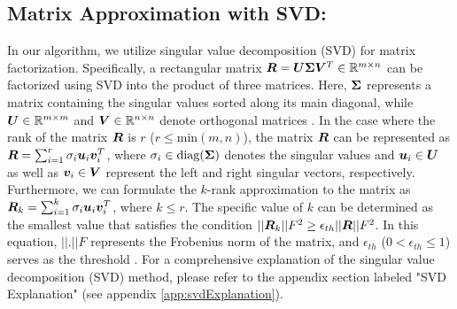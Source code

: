 \documentclass{article}
\begin{document}
\subsection{Matrix Approximation with SVD:}\vspace{-3mm} In our algorithm, we utilize singular value decomposition (SVD) for matrix factorization. Specifically, a rectangular matrix ${\bm{R}} = {\bm{U}}{\bm{\Sigma}}{\bm{V}}^T \in \mathbb{R}^{m\times n}$ can be factorized using SVD into the product of three matrices. Here, ${\bm{\Sigma}}$ represents a matrix containing the singular values sorted along its main diagonal, while ${\bm{U}} \in \mathbb{R}^{m\times m}$ and ${\bm{V}} \in \mathbb{R}^{n\times n}$ denote orthogonal matrices \cite{mml}. In the case where the rank of the matrix ${\bm{R}}$ is $r$ ($r\leq \text{min}(m,n)$), the matrix ${\bm{R}}$ can be represented as ${\bm{R}}=\sum_{i=1}^r \sigma_i{\bm{u}}_i {\bm{v}}_i^T$, where $\sigma_i \in \text{diag}({\bm{\Sigma}})$ denotes the singular values and ${\bm{u}}_i \in {\bm{U}}$ as well as ${\bm{v}}_i \in {\bm{V}}$ represent the left and right singular vectors, respectively. Furthermore, we can formulate the $k$-rank approximation to the matrix as ${\bm{R}}_k=\sum_{i=1}^k \sigma_i{\bm{u}}_i {\bm{v}}_i^T$, where $k\leq r$. The specific value of $k$ can be determined as the smallest value that satisfies the condition $||{\bm{R}}_k||F^2 \geq \epsilon_{th}||{\bm{R}}||F^2$. In this equation, $||.||F$ represents the Frobenius norm of the matrix, and $\epsilon_{th}$ ($0 <\epsilon_{th} \leq 1$) serves as the threshold \cite{mml}. For a comprehensive explanation of the singular value decomposition (SVD) method, please refer to the appendix section labeled "SVD Explanation" (see appendix \ref{app:svdExplanation}).
\end{document}
